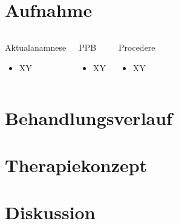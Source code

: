 \documentclass{beamer}
\begin{document}
\section{Aufnahme}
\begin{frame}


 \begin{columns}[t] %
 \vspace{0pt}
\begin{block}{Aktualanamnese}
\begin{itemize}
 \item \justifying XY
\end{itemize}
\end{block}

\begin{block}{PPB}
\begin{itemize}
\item \justifying XY
\end{itemize}
\end{block}

\begin{block}{Procedere}
\begin{itemize}
\item \justifying XY
\end{itemize}
\end{block}


\end{columns}
\end{frame}




\section{Behandlungsverlauf}



\section{Therapiekonzept}


\section{Diskussion}
\end{document}
